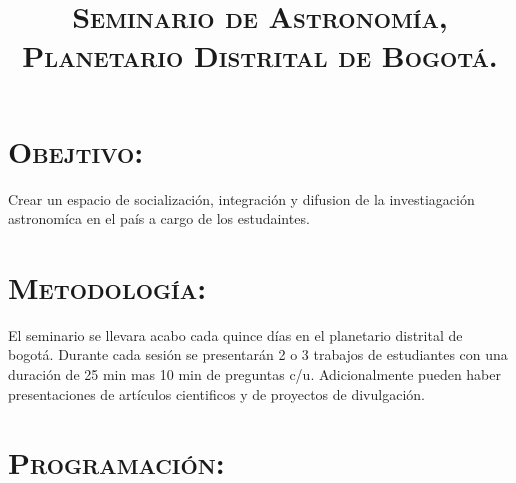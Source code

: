 \documentclass[12pt]{article}
\title{\textsc{Seminario de Astronom\'ia,\\ Planetario Distrital de Bogot\'a.}}
\begin{document}
\date{}
\maketitle

\section*{\textsc{Obejtivo:}}
Crear un espacio de socializaci\'on, integraci\'on y difusion de la investiagaci\'on astronom\'ica en el pa\'is
a cargo de los estudaintes.     

\section*{\textsc{Metodolog\'ia:}}
El seminario se llevara acabo cada quince d\'ias en el planetario distrital de bogot\'a.
Durante cada sesi\'on se presentar\'an 2 o 3 trabajos de estudiantes con una duraci\'on de 25 min mas 10 min de 
preguntas c/u. Adicionalmente pueden haber presentaciones de art\'iculos cientificos y de proyectos de divulgaci\'on.


\section*{\textsc{Programaci\'on:}}
\end{document}
